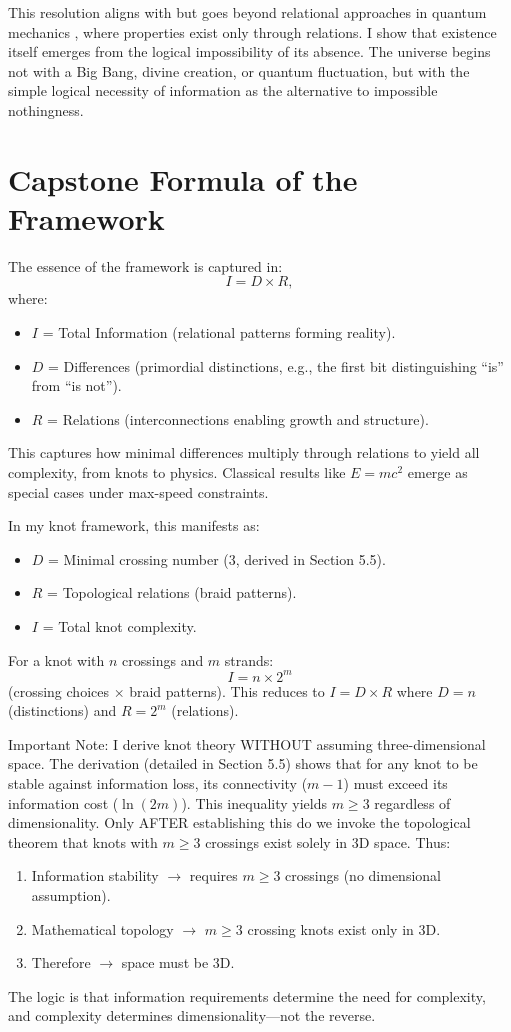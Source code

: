 \documentclass{article}
\begin{document}
This resolution aligns with but goes beyond relational approaches in quantum mechanics \cite{rovelli1996}, where properties exist only through relations. I show that existence itself emerges from the logical impossibility of its absence. The universe begins not with a Big Bang, divine creation, or quantum fluctuation, but with the simple logical necessity of information as the alternative to impossible nothingness.

\section{Capstone Formula of the Framework}
The essence of the framework is captured in:
\[
I = D \times R,
\]
where:
\begin{itemize}
\item $I$ = Total Information (relational patterns forming reality).
\item $D$ = Differences (primordial distinctions, e.g., the first bit distinguishing ``is'' from ``is not'').
\item $R$ = Relations (interconnections enabling growth and structure).
\end{itemize}
This captures how minimal differences multiply through relations to yield all complexity, from knots to physics. Classical results like $E = mc^2$ emerge as special cases under max-speed constraints.

In my knot framework, this manifests as:
\begin{itemize}
\item $D$ = Minimal crossing number (3, derived in Section 5.5).
\item $R$ = Topological relations (braid patterns).
\item $I$ = Total knot complexity.
\end{itemize}
For a knot with $n$ crossings and $m$ strands:
\[
I = n \times 2^m
\]
(crossing choices $\times$ braid patterns). This reduces to $I = D \times R$ where $D = n$ (distinctions) and $R = 2^m$ (relations).

Important Note: I derive knot theory WITHOUT assuming three-dimensional space. The derivation (detailed in Section 5.5) shows that for any knot to be stable against information loss, its connectivity ($m-1$) must exceed its information cost ($\ln(2m)$). This inequality yields $m \geq 3$ regardless of dimensionality. Only AFTER establishing this do we invoke the topological theorem that knots with $m \geq 3$ crossings exist solely in 3D space. Thus:
\begin{enumerate}
\item Information stability $\to$ requires $m \geq 3$ crossings (no dimensional assumption).
\item Mathematical topology $\to$ $m \geq 3$ crossing knots exist only in 3D.
\item Therefore $\to$ space must be 3D.
\end{enumerate}
The logic is that information requirements determine the need for complexity, and complexity determines dimensionality—not the reverse.
\end{document}
